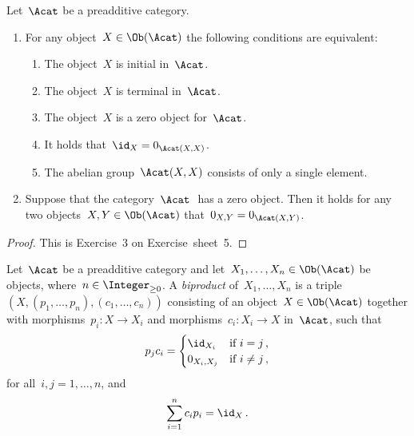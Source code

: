 \begin{lemma}
  \label{inital terminal zero}
  Let~$\Acat$ be a preadditive category.
  \begin{enumerate}
    \item
      For any object~$X \in \Ob(\Acat)$ the following conditions are equivalent:
      \begin{enumerate}
        \item
          The object~$X$ is initial in~$\Acat$.
        \item
          The object~$X$ is terminal in~$\Acat$.
        \item
          The object~$X$ is a zero object for~$\Acat$.
        \item
          It holds that~$\id_X = 0_{\Acat(X,X)}$.
        \item
          The abelian group~$\Acat(X,X)$ consists of only a single element.
      \end{enumerate}
    \item
      Suppose that the category~$\Acat~$ has a zero object.
      Then it holds for any two objects~$X, Y \in \Ob(\Acat)$ that~$0_{X,Y} = 0_{\Acat(X,Y)}$.
  \end{enumerate}
\end{lemma}


\begin{proof}
  This is Exercise~3 on Exercise~sheet~5.
\end{proof}







\begin{definition}
  Let~$\Acat$ be a preadditive category and let~$X_1, \dotsc, X_n \in \Ob(\Acat)$ be objects, where~$n \in \Integer_{\geq 0}$.
  A \emph{biproduct} of~$X_1, \dotsc, X_n$ is a triple~$(X, (p_1, \dotsc, p_n), (c_1, \dotsc, c_n))$ consisting of an object~$X \in \Ob(\Acat)$ together with morphisms~$p_i \colon X \to X_i$ and morphisms~$c_i \colon X_i \to X$ in~$\Acat$, such that
  \begin{equation}
    \label{no abuse of notation}
      p_j c_i
    = \begin{cases}
        \id_{X_i}     & \text{if~$i = j$}     \,, \\
        0_{X_i, X_j}  & \text{if~$i \neq j$}  \,,
      \end{cases}
  \end{equation}
  for all~$i,j = 1, \dots, n$, and
  \[
      \sum_{i=1}^n c_i p_i
    = {\id_X} \,.
  \]
\end{definition}


